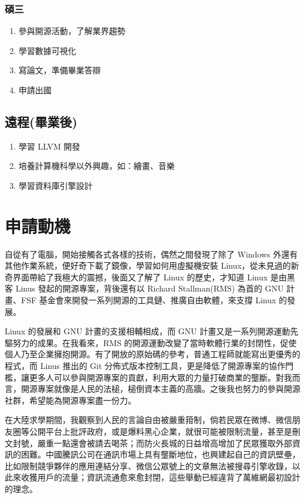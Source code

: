 \documentclass[classical]{einfart}
\providecommand{\tightlist}{%
  \setlength{\itemsep}{0pt}\setlength{\parskip}{0pt}}
\begin{document}
\subsubsection{碩三}

\begin{enumerate}
\def\labelenumi{\arabic{enumi}.}
\tightlist
\item
  參與開源活動，了解業界趨勢
\item
  學習數據可視化
\item
  寫論文，準備畢業答辯
\item
  申請出國
\end{enumerate}

\subsection{遠程(畢業後)}

\begin{enumerate}
\def\labelenumi{\arabic{enumi}.}
\tightlist
\item
  學習 LLVM 開發
\item
  培養計算機科學以外興趣，如：繪畫、音樂
\item
  學習資料庫引擎設計
\end{enumerate}

\section{申請動機}

自從有了電腦，開始接觸各式各樣的技術，偶然之間發現了除了 Windows
外還有其他作業系統，便好奇下載了鏡像，學習如何用虛擬機安裝
Linux，從未見過的新奇界面帶給了我極大的震撼，後面又了解了 Linux
的歷史，才知道 Linux 是由黑客 Linus 發起的開源專案，背後還有以 Richard
Stallman(RMS) 為首的 GNU 計畫、FSF
基金會來開發一系列開源的工具鏈、推廣自由軟體，來支撐 Linux 的發展。

Linux 的發展和 GNU 計畫的支援相輔相成，而 GNU
計畫又是一系列開源運動先驅努力的成果。在我看來，RMS
的開源運動改變了當時軟體行業的封閉性，促使個人乃至企業擁抱開源。有了開放的原始碼的參考，普通工程師就能寫出更優秀的程式，而
Linus 推出的 Git
分佈式版本控制工具，更是降低了開源專案的協作門檻，讓更多人可以參與開源專案的貢獻，利用大眾的力量打破商業的壟斷。對我而言，開源專案就像是人民的法槌，槌倒資本主義的高牆。之後我也努力的參與開源社群，希望能為開源專案盡一份力。

在大陸求學期間，我觀察到人民的言論自由被嚴重箝制，倘若民眾在微博、微信朋友圈等公開平台上批評政府，或是爆料黑心企業，就很可能被限制流量，甚至是刪文封號，嚴重一點還會被請去喝茶；而防火長城的日益增高增加了民眾獲取外部資訊的困難。中國騰訊公司在通訊市場上具有壟斷地位，也興建起自己的資訊壁壘，比如限制競爭夥伴的應用連結分享、微信公眾號上的文章無法被搜尋引擎收錄，以此來收獲用戶的流量；資訊流通愈來愈封閉，這些舉動已經違背了萬維網最初設計的理念。
\end{document}
